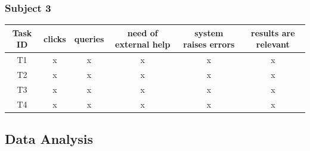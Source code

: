 \documentclass[unicode,9pt,a4paper,oneside,numbers=endperiod,openany]{scrartcl}
\begin{document}
\subsubsection{Subject 3}

\begin{tabular}{c|c|c|c|c|c}
    Task ID & clicks & queries & need of external help & system raises errors & results are relevant \\ \hline
    T1 & x & x & x & x & x \\
    T2 & x & x & x & x & x \\
    T3 & x & x & x & x & x \\
    T4 & x & x & x & x & x \\
\end{tabular}

\subsection{Data Analysis}
\end{document}
